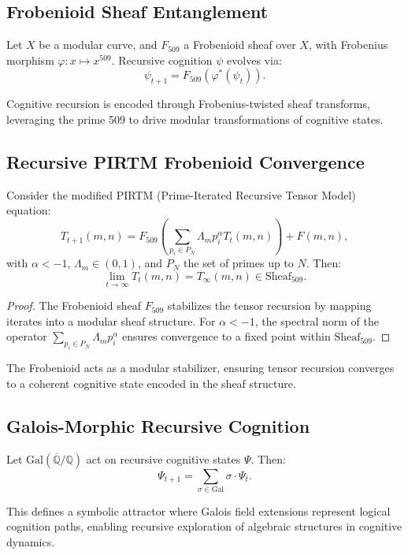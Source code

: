 \documentclass[12pt]{article}
\begin{document}
\subsection{Frobenioid Sheaf Entanglement}
\begin{axiom}
Let \( X \) be a modular curve, and \( F_{509} \) a Frobenioid sheaf over \( X \), with Frobenius morphism \( \varphi: x \mapsto x^{509} \). Recursive cognition \( \psi \) evolves via:
\[
\psi_{t+1} = F_{509}(\varphi^*(\psi_t)).
\]
\end{axiom}
\begin{interpretation}
Cognitive recursion is encoded through Frobenius-twisted sheaf transforms, leveraging the prime 509 to drive modular transformations of cognitive states.
\end{interpretation}

\subsection{Recursive PIRTM Frobenioid Convergence}
\begin{theorem}
Consider the modified PIRTM (Prime-Iterated Recursive Tensor Model) equation:
\[
T_{t+1}(m,n) = F_{509} \left( \sum_{p_i \in P_N} \Lambda_m p_i^\alpha T_t(m,n) \right) + F(m,n),
\]
with \( \alpha < -1 \), \( \Lambda_m \in (0,1) \), and \( P_N \) the set of primes up to \( N \). Then:
\[
\lim_{t \to \infty} T_t(m,n) = T_\infty(m,n) \in \text{Sheaf}_{509}.
\]
\end{theorem}
\begin{proof}
The Frobenioid sheaf \( F_{509} \) stabilizes the tensor recursion by mapping iterates into a modular sheaf structure. For \( \alpha < -1 \), the spectral norm of the operator \( \sum_{p_i \in P_N} \Lambda_m p_i^\alpha \) ensures convergence to a fixed point within \( \text{Sheaf}_{509} \).
\end{proof}
\begin{interpretation}
The Frobenioid acts as a modular stabilizer, ensuring tensor recursion converges to a coherent cognitive state encoded in the sheaf structure.
\end{interpretation}

\subsection{Galois-Morphic Recursive Cognition}
\begin{theorem}
Let \( \text{Gal}(\overline{\mathbb{Q}}/\mathbb{Q}) \) act on recursive cognitive states \( \Psi \). Then:
\[
\Psi_{t+1} = \sum_{\sigma \in \text{Gal}} \sigma \cdot \Psi_t.
\]
\end{theorem}
\begin{interpretation}
This defines a symbolic attractor where Galois field extensions represent logical cognition paths, enabling recursive exploration of algebraic structures in cognitive dynamics.
\end{interpretation}
\end{document}
